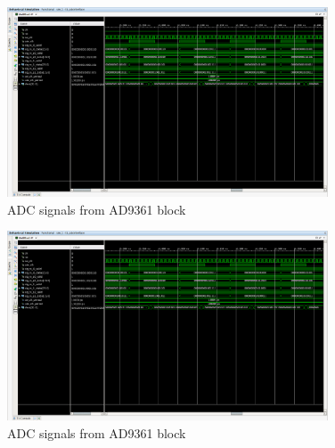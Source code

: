 \begin{figure}[htbp]
    \centering
    \includegraphics[width=0.85\textwidth]{./figures/adcInterface}
    \caption{ ADC signals from AD9361 block
    \label{fig:adcsignals}}
\end{figure}

\begin{figure}[htbp]
    \centering
    \includegraphics[width=0.85\textwidth]{./figures/adcInterface}
    \caption{ ADC signals from AD9361 block
    \label{fig:adcsignals}}
\end{figure}
